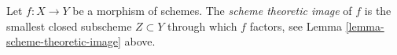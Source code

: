 \begin{definition}
\label{definition-scheme-theoretic-image}
Let $f : X \to Y$ be a morphism of schemes. The {\it scheme theoretic image}
of $f$ is the smallest closed subscheme $Z \subset Y$ through which $f$
factors, see Lemma \ref{lemma-scheme-theoretic-image} above.
\end{definition}